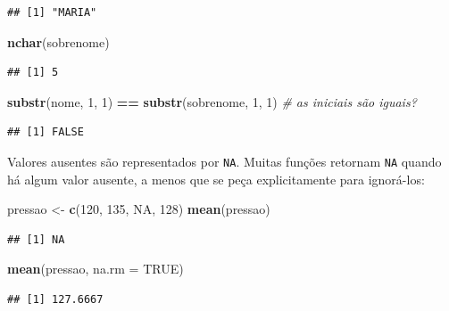 \documentclass[
]{book}
\newenvironment{Shaded}{\begin{snugshade}}{\end{snugshade}}
\newcommand{\AttributeTok}[1]{\textcolor[rgb]{0.13,0.29,0.53}{#1}}
\newcommand{\CommentTok}[1]{\textcolor[rgb]{0.56,0.35,0.01}{\textit{#1}}}
\newcommand{\ConstantTok}[1]{\textcolor[rgb]{0.56,0.35,0.01}{#1}}
\newcommand{\DecValTok}[1]{\textcolor[rgb]{0.00,0.00,0.81}{#1}}
\newcommand{\FunctionTok}[1]{\textcolor[rgb]{0.13,0.29,0.53}{\textbf{#1}}}
\newcommand{\NormalTok}[1]{#1}
\newcommand{\OtherTok}[1]{\textcolor[rgb]{0.56,0.35,0.01}{#1}}
\newcommand{\SpecialCharTok}[1]{\textcolor[rgb]{0.81,0.36,0.00}{\textbf{#1}}}
\begin{document}
\begin{verbatim}
## [1] "MARIA"
\end{verbatim}

\begin{Shaded}
\begin{Highlighting}[]
\FunctionTok{nchar}\NormalTok{(sobrenome)}
\end{Highlighting}
\end{Shaded}

\begin{verbatim}
## [1] 5
\end{verbatim}

\begin{Shaded}
\begin{Highlighting}[]
\FunctionTok{substr}\NormalTok{(nome, }\DecValTok{1}\NormalTok{, }\DecValTok{1}\NormalTok{) }\SpecialCharTok{==} \FunctionTok{substr}\NormalTok{(sobrenome, }\DecValTok{1}\NormalTok{, }\DecValTok{1}\NormalTok{)   }\CommentTok{\# as iniciais são iguais?}
\end{Highlighting}
\end{Shaded}

\begin{verbatim}
## [1] FALSE
\end{verbatim}

Valores ausentes são representados por \texttt{NA}. Muitas funções retornam \texttt{NA} quando há algum valor ausente, a menos que se peça explicitamente para ignorá-los:

\begin{Shaded}
\begin{Highlighting}[]
\NormalTok{pressao }\OtherTok{\textless{}{-}} \FunctionTok{c}\NormalTok{(}\DecValTok{120}\NormalTok{, }\DecValTok{135}\NormalTok{, }\ConstantTok{NA}\NormalTok{, }\DecValTok{128}\NormalTok{)}
\FunctionTok{mean}\NormalTok{(pressao)}
\end{Highlighting}
\end{Shaded}

\begin{verbatim}
## [1] NA
\end{verbatim}

\begin{Shaded}
\begin{Highlighting}[]
\FunctionTok{mean}\NormalTok{(pressao, }\AttributeTok{na.rm =} \ConstantTok{TRUE}\NormalTok{)}
\end{Highlighting}
\end{Shaded}

\begin{verbatim}
## [1] 127.6667
\end{verbatim}
\end{document}
